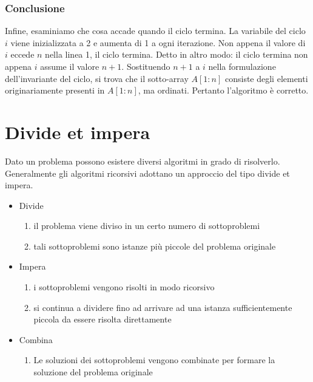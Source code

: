 \subsubsection{Conclusione}
Infine, esaminiamo che cosa accade quando il ciclo termina. La variabile del ciclo $i$ viene inizializzata a 2 e aumenta di 1 a ogni iterazione. Non appena il valore di $i$ eccede $n$ nella linea 1, il ciclo termina. Detto in altro modo: il ciclo termina non appena $i$ assume il valore $n+1$. Sostituendo $n+1$ a $i$ nella formulazione dell'invariante del ciclo, si trova che il sotto-array $A[1 : n]$ consiste degli elementi originariamente presenti in $A[1 : n]$, ma ordinati. Pertanto l'algoritmo è corretto.

\section{Divide et impera}
Dato un problema possono esistere diversi algoritmi in grado di risolverlo. Generalmente gli algoritmi ricorsivi adottano un approccio del tipo divide et impera.

\begin{itemize}
    \item Divide
        \begin{enumerate}
            \item il problema viene diviso in un certo numero di sottoproblemi
            \item tali sottoproblemi sono istanze più piccole del problema originale
        \end{enumerate}
    \item Impera
        \begin{enumerate}
            \item i sottoproblemi vengono risolti in modo ricorsivo
            \item si continua a dividere fino ad arrivare ad una istanza sufficientemente piccola da essere risolta direttamente
        \end{enumerate}
    \item Combina
    \begin{enumerate}
            \item Le soluzioni dei sottoproblemi vengono combinate per formare la soluzione del problema originale
        \end{enumerate}
\end{itemize}


